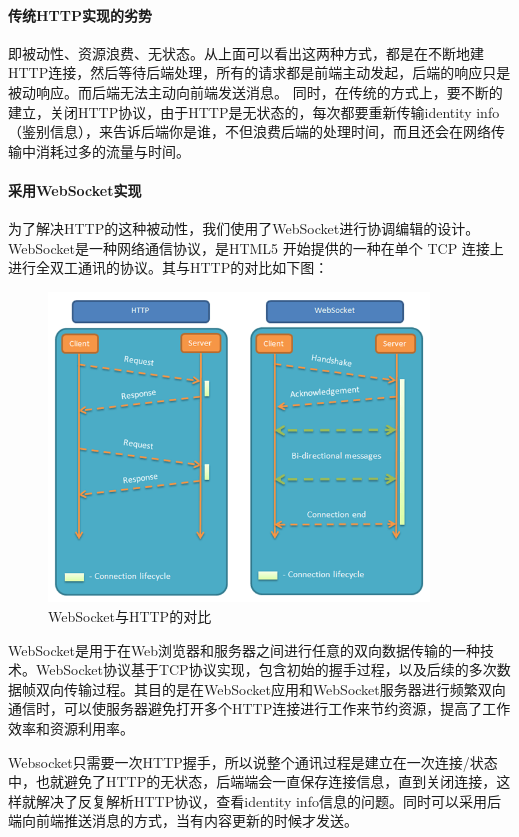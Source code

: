 \documentclass[UTF8]{ctexart}
\begin{document}
\paragraph{传统HTTP实现的劣势}
即被动性、资源浪费、无状态。从上面可以看出这两种方式，都是在不断地建HTTP连接，然后等待后端处理，所有的请求都是前端主动发起，后端的响应只是被动响应。而后端无法主动向前端发送消息。
同时，在传统的方式上，要不断的建立，关闭HTTP协议，由于HTTP是无状态的，每次都要重新传输identity info（鉴别信息），来告诉后端你是谁，不但浪费后端的处理时间，而且还会在网络传输中消耗过多的流量与时间。
\paragraph{采用WebSocket实现}
为了解决HTTP的这种被动性，我们使用了WebSocket进行协调编辑的设计。WebSocket是一种网络通信协议，是HTML5 开始提供的一种在单个 TCP 连接上进行全双工通讯的协议。其与HTTP的对比如下图：
\begin{figure}[h]
    \centering
    \includegraphics[width=0.9\textwidth, height=0.6\textwidth]{be2.png}
	\caption{WebSocket与HTTP的对比}
	\label{fig:对比}
\end{figure}
\par WebSocket是用于在Web浏览器和服务器之间进行任意的双向数据传输的一种技术。WebSocket协议基于TCP协议实现，包含初始的握手过程，以及后续的多次数据帧双向传输过程。其目的是在WebSocket应用和WebSocket服务器进行频繁双向通信时，可以使服务器避免打开多个HTTP连接进行工作来节约资源，提高了工作效率和资源利用率。

\par Websocket只需要一次HTTP握手，所以说整个通讯过程是建立在一次连接/状态中，也就避免了HTTP的无状态，后端端会一直保存连接信息，直到关闭连接，这样就解决了反复解析HTTP协议，查看identity info信息的问题。同时可以采用后端向前端推送消息的方式，当有内容更新的时候才发送。
\end{document}

